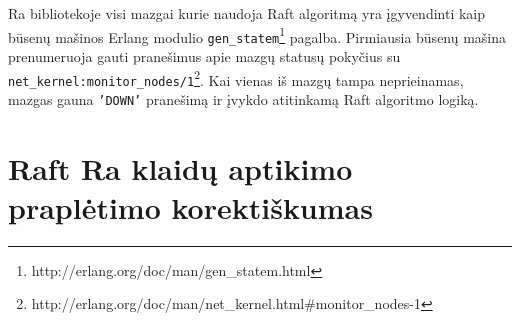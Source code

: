 \documentclass{VUMIFPSkursinis}
\begin{document}
Ra bibliotekoje visi mazgai kurie naudoja Raft algoritmą yra įgyvendinti kaip būsenų mašinos Erlang modulio \texttt{gen\_statem}\footnote{http://erlang.org/doc/man/gen\_statem.html} pagalba. 
Pirmiausia būsenų mašina  prenumeruoja gauti pranešimus apie mazgų statusų pokyčius su \texttt{net\_kernel:monitor\_nodes/1}\footnote{http://erlang.org/doc/man/net\_kernel.html\#monitor\_nodes-1}. Kai vienas iš mazgų tampa neprieinamas, mazgas gauna \texttt{'DOWN'} pranešimą ir įvykdo atitinkamą Raft algoritmo logiką.

\section{Raft Ra klaidų aptikimo praplėtimo korektiškumas}





\printbibliography[heading=bibintoc]  %


\appendix  %

\end{document}
